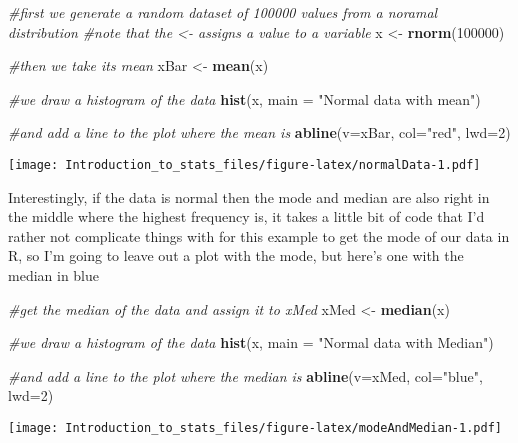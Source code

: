 \documentclass[
]{article}
\newenvironment{Shaded}{\begin{snugshade}}{\end{snugshade}}
\newcommand{\CommentTok}[1]{\textcolor[rgb]{0.56,0.35,0.01}{\textit{#1}}}
\newcommand{\DataTypeTok}[1]{\textcolor[rgb]{0.13,0.29,0.53}{#1}}
\newcommand{\DecValTok}[1]{\textcolor[rgb]{0.00,0.00,0.81}{#1}}
\newcommand{\KeywordTok}[1]{\textcolor[rgb]{0.13,0.29,0.53}{\textbf{#1}}}
\newcommand{\NormalTok}[1]{#1}
\newcommand{\StringTok}[1]{\textcolor[rgb]{0.31,0.60,0.02}{#1}}
\begin{document}
\begin{Shaded}
\begin{Highlighting}[]
\CommentTok{\#first we generate a random dataset of 100000 values from a noramal distribution}
\CommentTok{\#note that the \textless{}{-} assigns a value to a variable}
\NormalTok{x \textless{}{-}}\StringTok{ }\KeywordTok{rnorm}\NormalTok{(}\DecValTok{100000}\NormalTok{)}

\CommentTok{\#then we take it\textquotesingle{}s mean}
\NormalTok{xBar \textless{}{-}}\StringTok{ }\KeywordTok{mean}\NormalTok{(x)}

\CommentTok{\#we draw a histogram of the data}
\KeywordTok{hist}\NormalTok{(x, }\DataTypeTok{main =} \StringTok{"Normal data with mean"}\NormalTok{)}

\CommentTok{\#and add a line to the plot where the mean is}
\KeywordTok{abline}\NormalTok{(}\DataTypeTok{v=}\NormalTok{xBar, }\DataTypeTok{col=}\StringTok{"red"}\NormalTok{, }\DataTypeTok{lwd=}\DecValTok{2}\NormalTok{)}
\end{Highlighting}
\end{Shaded}

\texttt{[image: Introduction\_to\_stats\_files/figure-latex/normalData-1.pdf]}

Interestingly, if the data is normal then the mode and median are also
right in the middle where the highest frequency is, it takes a little
bit of code that I'd rather not complicate things with for this example
to get the mode of our data in R, so I'm going to leave out a plot with
the mode, but here's one with the median in blue

\begin{Shaded}
\begin{Highlighting}[]
\CommentTok{\#get the median of the data and assign it to xMed}
\NormalTok{xMed \textless{}{-}}\StringTok{ }\KeywordTok{median}\NormalTok{(x)}

\CommentTok{\#we draw a histogram of the data}
\KeywordTok{hist}\NormalTok{(x, }\DataTypeTok{main =} \StringTok{"Normal data with Median"}\NormalTok{)}

\CommentTok{\#and add a line to the plot where the median is}
\KeywordTok{abline}\NormalTok{(}\DataTypeTok{v=}\NormalTok{xMed, }\DataTypeTok{col=}\StringTok{"blue"}\NormalTok{, }\DataTypeTok{lwd=}\DecValTok{2}\NormalTok{)}
\end{Highlighting}
\end{Shaded}

\texttt{[image: Introduction\_to\_stats\_files/figure-latex/modeAndMedian-1.pdf]}
\end{document}
